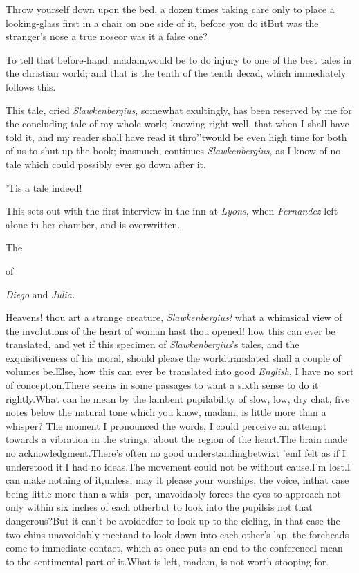 \documentclass{article}
\begin{document}
\tsk Throw yourself down upon the bed, a dozen times\tsk
taking care only to place a looking-glass first in a chair
on one side of it, before you do it\tsh But was the
stranger’s nose a true nose\tsk or was it a false one?

To tell that before-hand, madam,\break would be to do injury to one of
the best tales in the christian world; and that is the tenth of the
tenth decad, which immediately follows this.

This tale, cried \textit{Slawkenbergius}, somewhat exultingly, has
been reserved by me for the concluding tale of my whole work;
knowing right well, that when I shall have told it, and my reader
shall have read it thro’\tsk ’twould be even high
time for both of us to shut up the book; inasmuch, continues
\textit{Slawkenbergius}, as I know of no tale which could possibly
ever go down after it.

\tsh ’Tis a tale indeed!

This sets out with the first interview in the inn at
\textit{Lyons}, when \textit{Fernandez} left 
alone in her chamber, and is overwritten.

\bigskip
\centerline{The\enspace{}}
\centerline{of}
\centerline{\textit{Diego} and \textit{Julia.}}

Heavens! thou art a strange creature, \textit{Slawkenbergius!}
what a whimsical view of the involutions of the heart of woman hast
thou opened! how this can ever be translated, and yet if this
specimen of \textit{Slawkenbergius}’s tales, and the
exquisitiveness of his moral, should please the
world\tsk translated shall a couple of volumes
be.\tsk Else, how this can ever be translated into good
\textit{English}, I have no sort of conception.\tsk There seems in
some passages to want a sixth sense to do it
rightly.\tsh What can he mean by the\break 
lambent pupilability of slow, low, dry\break
chat, five notes below the natural tone\break
\tsh which you know, madam, is little more than a
whisper? The moment I pronounced the words, I could perceive an
attempt towards a vibration in the strings, about the region of the
heart.\tsh The brain made no
acknowledgment.\tsh There’s often no good
understanding\break betwixt ’em\tsk I felt as if I understood
it.\tsk I had no ideas.\tsk The movement could
not be without cause.\tsk I’m lost.\break I can make nothing of
it,\tsk unless, may\break
it please your worships, the voice, in\break that
case being little more than a whis-\break
per, unavoidably forces the eyes to\break
approach not only within six inches\break
of each other\tsk but to look into the\break
pupils\tsk is not that dangerous?\tsh But it\break
can’t be avoided\tsk for to look up to the cieling, in
that case the two chins unavoidably meet\tsk and to look
down into each other’s lap, the foreheads come to immediate
contact, which at once puts an end to the conference\tsk I
mean to the sentimental part of it.\tsh What is left,
madam, is not worth stooping for.
\end{document}
